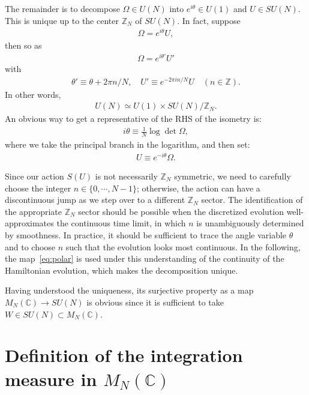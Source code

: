 \documentclass[12pt]{article}
\begin{document}
The remainder is to decompose $\Omega \in U(N)$
into $e^{i\theta} \in U(1)$ and $U \in SU(N)$.
This is unique up to the center $\mathbb{Z}_{N}$ of $SU(N)$.
In fact, suppose
\begin{align}
  \Omega = e^{i \theta} U,
\end{align}
then so as
\begin{align}
  \Omega = e^{i \theta'} U'
\end{align}
with
\begin{align}
  \theta' \equiv \theta + 2\pi n/N,
  \quad
  U' \equiv e^{-2\pi i n/N} U
  \quad (n \in \mathbb{Z}).
\end{align}
In other words,
\begin{align}
  U(N) \simeq U(1) \times SU(N) / \mathbb{Z}_{N}.
\end{align}
An obvious way to get a representative of the RHS of the isometry is:
\begin{align}
  i\theta \equiv \frac{1}{N} \log \det \Omega,
\end{align}
where we take the principal branch in the logarithm,
and then set:
\begin{align}
  U \equiv e^{-i\theta} \Omega.
\end{align}

Since our action $S(U)$ is not necessarily $\mathbb{Z}_{N}$ symmetric,
we need to carefully choose the integer $n \in \{0,\cdots,N-1\}$;
otherwise, the action can have a discontinuous jump
as we step over to a different $\mathbb{Z}_N$ sector.
The identification of the appropriate $\mathbb{Z}_{N}$ sector
should be possible when
the discretized evolution well-approximates the continuous time limit,
in which $n$ is unambiguously determined by smoothness.
In practice, it should be sufficient to trace
the angle variable $\theta$
and to choose $n$ such that the evolution looks most continuous.
In the following, the map~\eqref{eq:polar}
is used under this understanding of the continuity of the Hamiltonian evolution,
which makes the decomposition unique.

Having understood the uniqueness,
its surjective property as a map $M_N(\mathbb{C}) \to SU(N)$ is obvious
since it is sufficient to take $W \in SU(N) \subset M_N(\mathbb{C})$.


\section{Definition of the integration measure in $M_N(\mathbb{C})$}
\label{sec:measure}
\end{document}
